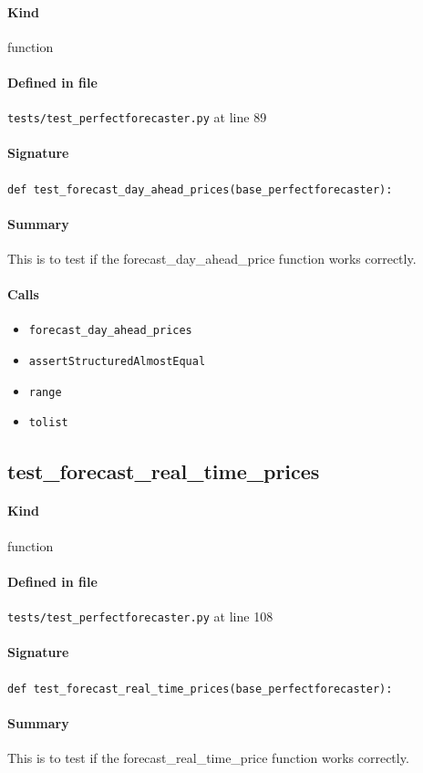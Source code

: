 \documentclass[11pt]{report}
\begin{document}
\paragraph{Kind} function
\paragraph{Defined in file} \texttt{tests/test\_perfectforecaster.py} at line 89
\paragraph{Signature} \texttt{def test\_forecast\_day\_ahead\_prices(base\_perfectforecaster):}
\paragraph{Summary} This is to test if the forecast\_day\_ahead\_price function works correctly.
\paragraph{Calls}
\begin{itemize}[leftmargin=*]
  \item \texttt{forecast\_day\_ahead\_prices}
  \item \texttt{assertStructuredAlmostEqual}
  \item \texttt{range}
  \item \texttt{tolist}
\end{itemize}
\subsection{test\_forecast\_real\_time\_prices}
\label{def:tests-test_perfectforecaster.py:test_forecast_real_time_prices:L108}
\paragraph{Kind} function
\paragraph{Defined in file} \texttt{tests/test\_perfectforecaster.py} at line 108
\paragraph{Signature} \texttt{def test\_forecast\_real\_time\_prices(base\_perfectforecaster):}
\paragraph{Summary} This is to test if the forecast\_real\_time\_price function works correctly.
\end{document}
